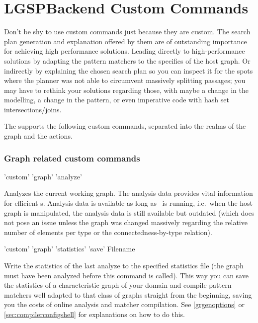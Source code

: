 \section{LGSPBackend Custom Commands}
\label{custom}


Don't be shy to use custom commands just because they are custom.
The search plan generation and explanation offered by them are of outstanding importance for achieving high performance solutions.
Leading directly to high-performance solutions by adapting the pattern matchers to the specifics of the host graph.
Or indirectly by explaining the chosen search plan so you can inspect it for the spots where the planner was not able to circumvent massively splitting passages; you may have to rethink your solutions regarding those, with maybe a change in the modelling, a change in the pattern, or even imperative code with hash set intersections/joins.

The  supports the following custom commands, separated into the realms of the graph and the actions.

\subsubsection*{Graph related custom commands}\label{sec:graphcustomcommands}

\begin{rail}
  'custom' 'graph' 'analyze'
\end{rail}
Analyzes the current working graph.
The analysis data provides vital information for efficient s.
Analysis data is available as long as \GrShell\ is running, i.e.\ when the host graph is manipulated, the analysis data is still available but outdated (which does not pose an issue unless the graph was changed massively regarding the relative number of elements per type or the connectedness-by-type relation).

\begin{rail}
  'custom' 'graph' 'statistics' 'save' Filename
\end{rail}
Write the statistics of the last analyze to the specified statistics file (the graph must have been analyzed before this command is called).
This way you can save the statistics of a characteristic graph of your domain and compile pattern matchers well adapted to that class of graphs straight from the beginning, saving you the costs of online analysis and matcher compilation.
See \ref{grgenoptions} or \ref{sec:compilerconfigshell} for explanations on how to do this.


